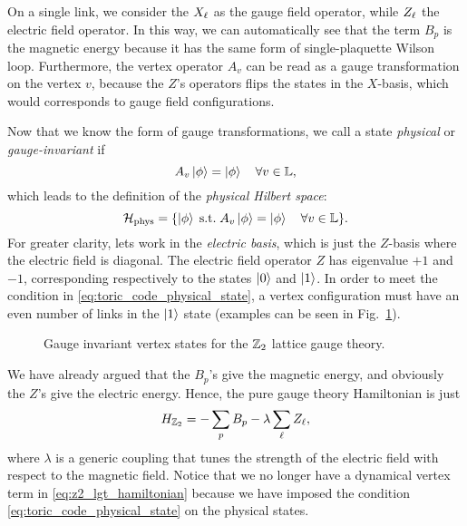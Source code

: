 On a single link, we consider the $X_{\ell}$ as the gauge field operator, while $Z_{\ell}$ the electric field operator.
In this way, we can automatically see that the term $B_p$ is the magnetic energy because it has the same form of single-plaquette Wilson loop.
Furthermore, the vertex operator $A_v$ can be read as a gauge transformation on the vertex $v$, because the $Z$'s operators flips the states in the $X$-basis, which would corresponds to gauge field configurations.

Now that we know the form of gauge transformations, we call a state \emph{physical} or \emph{gauge-invariant} if
\begin{equation}
    A_v \ket{\phi} = \ket{\phi} \quad \forall v \in \mathbb{L},
    \label{eq:toric_code_physical_state}
\end{equation}
which leads to the definition of the \emph{physical Hilbert space}:
\begin{equation}
    \mathcal{H}_{\text{phys}} = \{\ket{\phi} \; \text{s.t.} \; A_v \ket{\phi} = \ket{\phi} \quad \forall v \in \mathbb{L}\}.
\end{equation}
For greater clarity, lets work in the \emph{electric basis}, which is just the $Z$-basis where the electric field is diagonal.
The electric field operator $Z$ has eigenvalue $+1$ and $-1$, corresponding respectively to the states $\ket{0}$ and $\ket{1}$.
In order to meet the condition in \eqref{eq:toric_code_physical_state}, a vertex configuration must have an even number of links in the $\ket{1}$ state (examples can be seen in Fig.~\ref{fig:gauge_inv_vertices_z2}).

\begin{figure}[t]
    \centering
    
    \caption{Gauge invariant vertex states for the $\mathbb{Z}_2$ lattice gauge theory.}
    \label{fig:gauge_inv_vertices_z2}
\end{figure}

We have already argued that the $B_p$'s give the magnetic energy, and obviously the $Z$'s give the electric energy.
Hence, the pure gauge theory Hamiltonian is just
\begin{equation}
    H_{\mathbb{Z}_2} = - \sum_{p} B_p - \lambda \sum_{\ell} Z_{\ell},
    \label{eq:z2_lgt_hamiltonian}
\end{equation}
where $\lambda$ is a generic coupling that tunes the strength of the electric field with respect to the magnetic field.
Notice that we no longer have a dynamical vertex term in \eqref{eq:z2_lgt_hamiltonian} because we have imposed the condition \eqref{eq:toric_code_physical_state} on the physical states.

